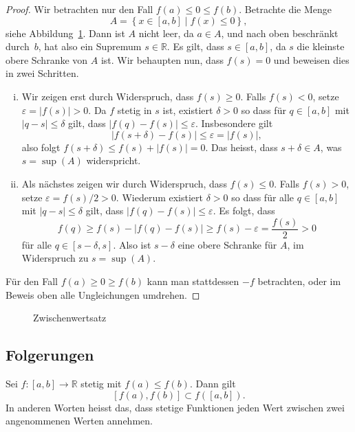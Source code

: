 \documentclass[../main.tex]{subfiles}
\begin{document}
\begin{proof}
  Wir betrachten nur den Fall $f(a) \leq 0 \leq f(b)$.
  Betrachte die Menge
  \[
    A = \left\{x \in [a, b] \mid f(x) \leq 0\right\},
  \]
  siehe Abbildung~\ref{fig:zwischen}.
  Dann ist $A$ nicht leer, da $a \in A$, und nach oben
  beschränkt durch~$b$,
  hat also ein Supremum $s \in \mathbb{R}$.
  Es gilt, dass $s \in [a,b]$, da $s$ die kleinste
  obere Schranke von $A$ ist.
  Wir behaupten nun, dass $f(s) = 0$ und beweisen
  dies in zwei Schritten.

  \begin{enumerate}[(i)]
    \item Wir zeigen erst durch Widerspruch, dass $f(s) \geq 0$.
      Falls $f(s) < 0$, setze
      $\varepsilon = |f(s)| > 0$. Da $f$ stetig in $s$ ist,
      existiert $\delta > 0$ so dass
      für $q \in [a, b]$
      mit $|q - s| \leq \delta$ gilt, dass
      $|f(q) - f(s)| \leq \varepsilon$.
      Insbesondere gilt
      \[
      |f(s + \delta) - f(s)| \leq \varepsilon = |f(s)|,
      \]
        also folgt
        $f(s + \delta) \leq f(s) + |f(s)| = 0$.
      Das heisst, dass $s + \delta \in A$, was
      $s = \sup(A)$ widerspricht.
    \item Als nächstes zeigen wir durch Widerspruch,
      dass $f(s) \leq 0$. 
      Falls $f(s) > 0$,
      setze $\varepsilon = f(s)/2 > 0$.
      Wiederum existiert $\delta > 0$ 
      so dass für alle $q \in [a, b]$ mit $|q- s| \leq \delta$ 
      gilt, dass
      $|f(q) - f(s)| \leq \varepsilon$.
      Es folgt, dass
      \[
        f(q) \geq f(s) - |f(q) - f(s)| \geq f(s) - \varepsilon = \frac{f(s)}{2}
        > 0
      \]
      für alle $q \in [s - \delta, s]$.
      Also ist $s - \delta$ eine obere Schranke für $A$,
      im Widerspruch zu $s = \sup(A)$.
  \end{enumerate}
  Für den Fall $f(a) \geq 0 \geq f(b)$ kann man
  stattdessen $-f$ betrachten,
  oder im Beweis oben alle Ungleichungen umdrehen.
\end{proof}

\begin{figure}[htb]
  \centering
  
  \caption{Zwischenwertsatz}%
  \label{fig:zwischen}
\end{figure}

\subsection*{Folgerungen}
\begin{zwischenwertsatz}
  Sei $f \colon [a, b] \to \mathbb{R} $
  stetig mit $f(a) \leq f(b)$.
  Dann gilt 
  \[[f(a), f(b)] \subset f([a, b]).\]
  In anderen Worten heisst das, dass stetige
  Funktionen jeden Wert zwischen
  zwei angenommenen Werten annehmen.
\end{zwischenwertsatz}
\end{document}
